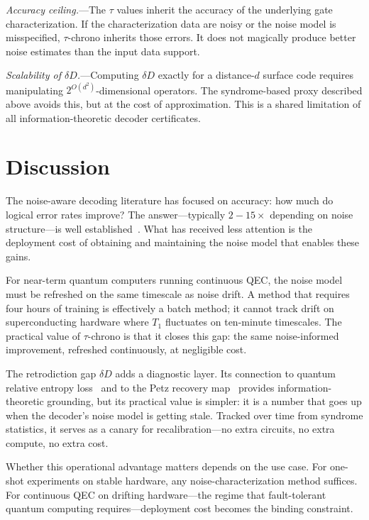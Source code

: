 \documentclass[prl,twocolumn,superscriptaddress,longbibliography]{revtex4-2}
\newcommand{\dd}{\delta\!D}
\begin{document}
\emph{Accuracy ceiling.}---The $\tau$ values inherit the accuracy of the underlying gate characterization. If the characterization data are noisy or the noise model is misspecified, $\tau$-chrono inherits those errors. It does not magically produce better noise estimates than the input data support.

\emph{Scalability of $\dd$.}---Computing $\dd$ exactly for a distance-$d$ surface code requires manipulating $2^{O(d^2)}$-dimensional operators. The syndrome-based proxy described above avoids this, but at the cost of approximation. This is a shared limitation of all information-theoretic decoder certificates.

\section{Discussion}

The noise-aware decoding literature has focused on accuracy: how much do logical error rates improve? The answer---typically $2{-}15\times$ depending on noise structure---is well established~\cite{Tuckett2018,Hockings2025,AlphaQubit2024,Joshi2026}. What has received less attention is the deployment cost of obtaining and maintaining the noise model that enables these gains.

For near-term quantum computers running continuous QEC, the noise model must be refreshed on the same timescale as noise drift. A method that requires four hours of training is effectively a batch method; it cannot track drift on superconducting hardware where $T_1$ fluctuates on ten-minute timescales. The practical value of $\tau$-chrono is that it closes this gap: the same noise-informed improvement, refreshed continuously, at negligible cost.

The retrodiction gap $\dd$ adds a diagnostic layer. Its connection to quantum relative entropy loss~\cite{Junge2018,Sutter2016} and to the Petz recovery map~\cite{Petz1986,Parzygnat2023} provides information-theoretic grounding, but its practical value is simpler: it is a number that goes up when the decoder's noise model is getting stale. Tracked over time from syndrome statistics, it serves as a canary for recalibration---no extra circuits, no extra compute, no extra cost.

Whether this operational advantage matters depends on the use case. For one-shot experiments on stable hardware, any noise-characterization method suffices. For continuous QEC on drifting hardware---the regime that fault-tolerant quantum computing requires---deployment cost becomes the binding constraint.
\end{document}
